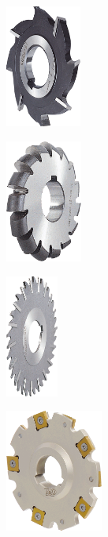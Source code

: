 \documentclass[11pt,oneside]{article}
\begin{document}
\begin{minipage}[c]{.2\linewidth}
\begin{center}
\includegraphics[height=4cm]{png/fr_3t}
\end{center}
\end{minipage} \hfill
\begin{minipage}[c]{.2\linewidth}
\begin{center}
\includegraphics[height=4cm]{png/fr_3t_2}
\end{center}
\end{minipage} \hfill
\begin{minipage}[c]{.2\linewidth}
\begin{center}
\includegraphics[height=4cm]{png/fr_disque}
\end{center}
\end{minipage} \hfill
\begin{minipage}[c]{.2\linewidth}
\begin{center}
\includegraphics[height=4cm]{png/fr_disque_2}
\end{center}
\end{minipage} 
\end{document}
